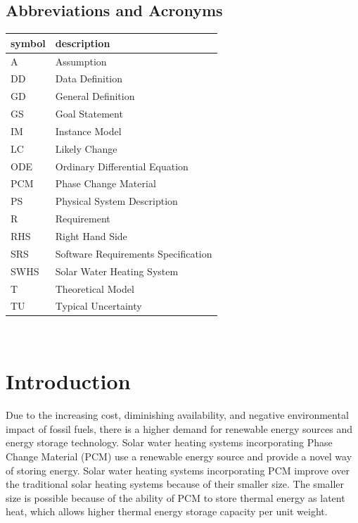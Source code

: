 \documentclass[12pt]{article}
\newcommand{\blt}{- } %
\newcommand{\progname}{SWHS}
\begin{document}


\subsection{Abbreviations and Acronyms}

\renewcommand{\arraystretch}{1.2}
\begin{tabular}{l l} 
  \toprule		
  \textbf{symbol} & \textbf{description}\\
  \midrule 
  A & Assumption\\
  DD & Data Definition\\
  GD & General Definition\\
  GS & Goal Statement\\
  IM & Instance Model\\
  LC & Likely Change\\
  ODE & Ordinary Differential Equation\\
  PCM & Phase Change Material\\
  PS & Physical System Description\\
  R & Requirement\\
  RHS & Right Hand Side\\
  SRS & Software Requirements Specification\\
  \progname{} & Solar Water Heating System\\
  T & Theoretical Model\\
  TU & Typical Uncertainty\\
  \bottomrule
\end{tabular}\\

\section{Introduction}

Due to the increasing cost, diminishing availability, and negative environmental
impact of fossil fuels, there is a higher demand for renewable energy sources
and energy storage technology.  Solar water heating systems incorporating Phase
Change Material (PCM) use a renewable energy source and provide a novel way of
storing energy.  Solar water heating systems incorporating PCM improve over the
traditional solar heating systems because of their smaller size.  The smaller
size is possible because of the ability of PCM to store thermal energy as latent
heat, which allows higher thermal energy storage capacity per unit weight.
\end{document}
